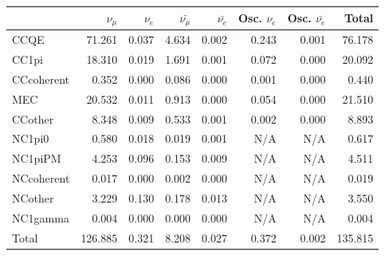 
\begin{table}
\center
\begin{tabular} { | l ||r | r | r | r | r | r | | r | }
\hline

              & $\nu_\mu$            & $\nu_e$              & $\bar{\nu_\mu}$      & $\bar{\nu_e}$        & Osc. $\nu_e$         & Osc. $\bar{\nu_e}$   & Total                \\ \hline\hline
 CCQE         & 71.261               & 0.037                & 4.634                & 0.002                & 0.243                & 0.001                & 76.178               \\ \hline
 CC1pi        & 18.310               & 0.019                & 1.691                & 0.001                & 0.072                & 0.000                & 20.092               \\ \hline
 CCcoherent   & 0.352                & 0.000                & 0.086                & 0.000                & 0.001                & 0.000                & 0.440                \\ \hline
 MEC          & 20.532               & 0.011                & 0.913                & 0.000                & 0.054                & 0.000                & 21.510               \\ \hline
 CCother      & 8.348                & 0.009                & 0.533                & 0.001                & 0.002                & 0.000                & 8.893                \\ \hline
 NC1pi0       & 0.580                & 0.018                & 0.019                & 0.001                & N/A                  & N/A                  & 0.617                \\ \hline
 NC1piPM      & 4.253                & 0.096                & 0.153                & 0.009                & N/A                  & N/A                  & 4.511                \\ \hline
 NCcoherent   & 0.017                & 0.000                & 0.002                & 0.000                & N/A                  & N/A                  & 0.019                \\ \hline
 NCother      & 3.229                & 0.130                & 0.178                & 0.013                & N/A                  & N/A                  & 3.550                \\ \hline
 NC1gamma     & 0.004                & 0.000                & 0.000                & 0.000                & N/A                  & N/A                  & 0.004                \\ \hline
\hline
 Total        & 126.885              & 0.321                & 8.208                & 0.027                & 0.372                & 0.002                & 135.815              \\ \hline


\end{tabular}
\end{table}
